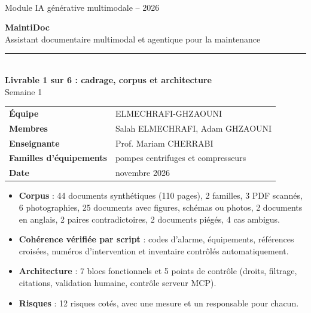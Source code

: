 \documentclass[11pt,a4paper]{article}
\begin{document}
\begin{titlepage}
\begin{tcolorbox}[colback=navy,colframe=navy,arc=0pt,left=14pt,top=16pt,bottom=16pt]
\color{white}{\large EMSI -- École Marocaine des Sciences de l'Ingénieur}\\[2pt]
{\small Module IA générative multimodale -- 2026}
\end{tcolorbox}
\vspace{3cm}
{\color{navy}\Huge\bfseries MaintiDoc}\\[6pt]
{\Large Assistant documentaire multimodal et agentique pour la maintenance}\\[4pt]
{\color{gold}\rule{\linewidth}{2pt}}\\[8pt]
{\LARGE\bfseries Livrable 1 sur 6 : cadrage, corpus et architecture}\\[4pt]
{\large Semaine 1}
\vfill
\begin{tabular}{@{}ll}
\textbf{Équipe} & ELMECHRAFI-GHZAOUNI \\
\textbf{Membres} & Salah ELMECHRAFI, Adam GHZAOUNI \\
\textbf{Enseignante} & Prof. Mariam CHERRABI \\
\textbf{Familles d'équipements} & pompes centrifuges et compresseurs \\
\textbf{Date} & novembre 2026 \\
\end{tabular}
\vspace{1.5cm}
\end{titlepage}

\tableofcontents
\vspace{6pt}
\begin{idee}
\begin{itemize}
\item \textbf{Corpus} : 44 documents synthétiques (110 pages), 2 familles, 3 PDF scannés, 6 photographies, 25 documents avec figures, schémas ou photos, 2 documents en anglais, 2 paires contradictoires, 2 documents piégés, 4 cas ambigus.
\item \textbf{Cohérence vérifiée par script} : codes d'alarme, équipements, références croisées, numéros d'intervention et inventaire contrôlés automatiquement.
\item \textbf{Architecture} : 7 blocs fonctionnels et 5 points de contrôle (droits, filtrage, citations, validation humaine, contrôle serveur MCP).
\item \textbf{Risques} : 12 risques cotés, avec une mesure et un responsable pour chacun.
\end{itemize}
\end{idee}
\newpage
\end{document}
